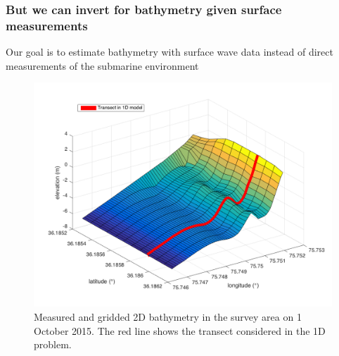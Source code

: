 \documentclass[7pt]{beamer}
\begin{document}
\begin{frame}
 \frametitle{But we can invert for bathymetry given surface measurements}

Our goal is to estimate bathymetry with surface wave data instead of direct measurements of the submarine environment

\begin{figure}[H]
	 	\centering
	 	\includegraphics[width=0.6\linewidth]{img/trueBath2D.png}
	 	\caption{Measured and gridded 2D bathymetry in the survey area on 1 October 2015. The red line shows the transect considered in the 1D problem.}
	 	\label{2D Bath}
	 	\end{figure}

\end{frame}
\end{document}
